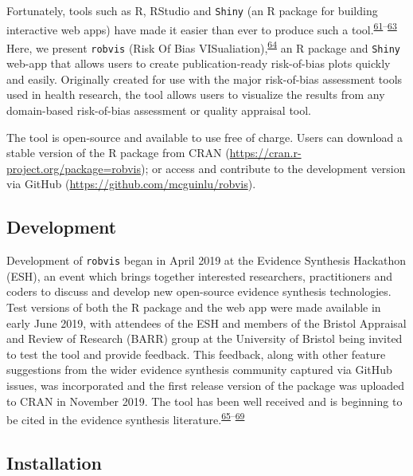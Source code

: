 \documentclass[a4paper, twoside]{templates/ociamthesis}
\begin{document}
Fortunately, tools such as R, RStudio and \texttt{Shiny} (an R package for building interactive web apps) have made it easier than ever to produce such a tool.\textsuperscript{\protect\hyperlink{ref-rref}{61}--\protect\hyperlink{ref-shinyref}{63}} Here, we present \texttt{robvis} (Risk Of Bias VISualiation),\textsuperscript{\protect\hyperlink{ref-mcguinness2019a}{64}} an R package and \texttt{Shiny} web-app that allows users to create publication-ready risk-of-bias plots quickly and easily. Originally created for use with the major risk-of-bias assessment tools used in health research, the tool allows users to visualize the results from any domain-based risk-of-bias assessment or quality appraisal tool.

The tool is open-source and available to use free of charge. Users can download a stable version of the R package from CRAN (\url{https://cran.r-project.org/package=robvis}); or access and contribute to the development version via GitHub (\url{https://github.com/mcguinlu/robvis}).

\hypertarget{development-1}{%
\subsection{Development}\label{development-1}}

Development of \texttt{robvis} began in April 2019 at the Evidence Synthesis Hackathon (ESH), an event which brings together interested researchers, practitioners and coders to discuss and develop new open-source evidence synthesis technologies. Test versions of both the R package and the web app were made available in early June 2019, with attendees of the ESH and members of the Bristol Appraisal and Review of Research (BARR) group at the University of Bristol being invited to test the tool and provide feedback. This feedback, along with other feature suggestions from the wider evidence synthesis community captured via GitHub issues, was incorporated and the first release version of the package was uploaded to CRAN in November 2019. The tool has been well received and is beginning to be cited in the evidence synthesis literature.\textsuperscript{\protect\hyperlink{ref-gibb2019consistent}{65}--\protect\hyperlink{ref-tanneru2020}{69}}

\hypertarget{installation-1}{%
\subsection{Installation}\label{installation-1}}
\end{document}
